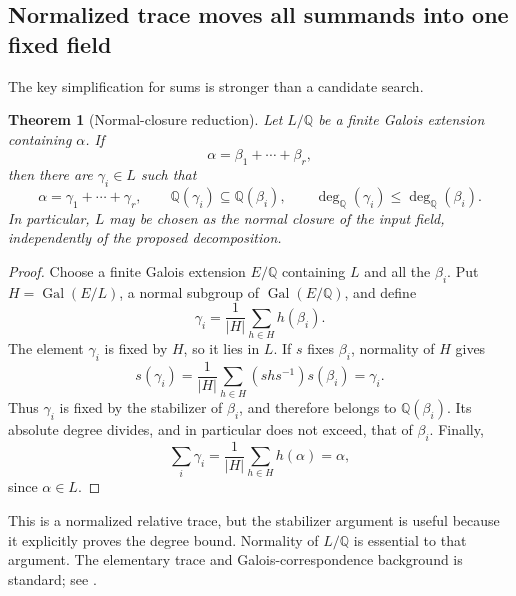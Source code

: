 \documentclass[11pt,letterpaper]{article}
\newtheorem{theorem}{Theorem}[section]
\theoremstyle{definition}
\newcommand{\Q}{\mathbb Q}
\newcommand{\Gal}{\operatorname{Gal}}
\newcommand{\dq}{\deg_{\Q}}
\begin{document}
\subsection{Normalized trace moves all summands into one fixed field}
The key simplification for sums is stronger than a candidate search.
\begin{samepage}
\begin{theorem}[Normal-closure reduction]\label{thm:tracereduction}
Let $L/\Q$ be a finite Galois extension containing $\alpha$. If
\[
 \alpha=\beta_1+\cdots+\beta_r,
\]
then there are $\gamma_i\in L$ such that
\[
 \alpha=\gamma_1+\cdots+\gamma_r,
 \qquad \Q(\gamma_i)\subseteq\Q(\beta_i),
 \qquad \dq(\gamma_i)\le\dq(\beta_i).
\]
In particular, $L$ may be chosen as the normal closure of the input field, independently of the proposed decomposition.
\end{theorem}
\end{samepage}
\begin{proof}
Choose a finite Galois extension $E/\Q$ containing $L$ and all the $\beta_i$. Put $H=\Gal(E/L)$, a normal subgroup of $\Gal(E/\Q)$, and define
\[
 \gamma_i=\frac{1}{|H|}\sum_{h\in H}h(\beta_i).
\]
The element $\gamma_i$ is fixed by $H$, so it lies in $L$. If $s$ fixes $\beta_i$, normality of $H$ gives
\[
 s(\gamma_i)=\frac{1}{|H|}\sum_{h\in H}(shs^{-1})s(\beta_i)
           =\gamma_i.
\]
Thus $\gamma_i$ is fixed by the stabilizer of $\beta_i$, and therefore belongs to $\Q(\beta_i)$. Its absolute degree divides, and in particular does not exceed, that of $\beta_i$. Finally,
\[
 \sum_i\gamma_i=\frac1{|H|}\sum_{h\in H}h(\alpha)=\alpha,
\]
since $\alpha\in L$.
\end{proof}
This is a normalized relative trace, but the stabilizer argument is useful because it explicitly proves the degree bound. Normality of $L/\Q$ is essential to that argument. The elementary trace and Galois-correspondence background is standard; see \cite[Sections 3 and 5]{milne}.
\end{document}
